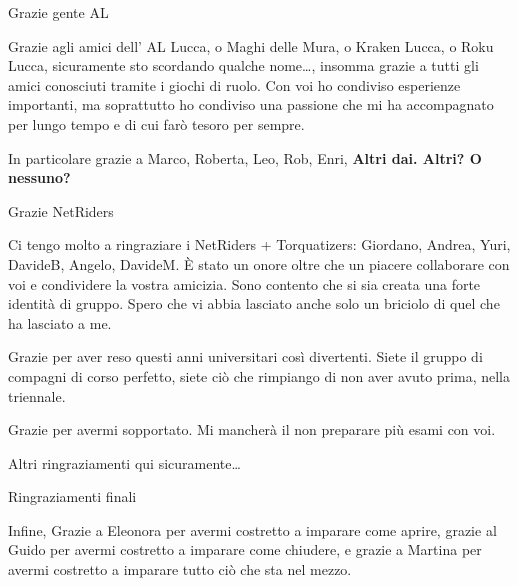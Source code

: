 \documentclass[a4paper,11pt]{article}
\begin{document}
	Grazie gente AL
	
	{\color{red} Grazie agli amici dell' AL Lucca, o Maghi delle Mura, o Kraken Lucca, o Roku Lucca, sicuramente sto scordando qualche nome\dots, insomma grazie a tutti gli amici conosciuti tramite i giochi di ruolo. Con voi ho condiviso esperienze importanti, ma soprattutto ho condiviso una passione che mi ha accompagnato per lungo tempo e di cui farò tesoro per sempre.
	
	In particolare grazie a Marco, Roberta, Leo, Rob, Enri, \textbf{Altri dai. Altri? O nessuno?}}
	\medskip 
	
	Grazie NetRiders
	
	{\color{red} Ci tengo molto a ringraziare i NetRiders + Torquatizers: Giordano, Andrea, Yuri, DavideB, Angelo, DavideM. \`E stato un onore oltre che un piacere collaborare con voi e condividere la vostra amicizia. Sono contento che si sia creata una forte identità di gruppo. Spero che vi abbia lasciato anche solo un briciolo di quel che ha lasciato a me.
		
	Grazie per aver reso questi anni universitari così divertenti. Siete il gruppo di compagni di corso perfetto, siete ciò che rimpiango di non aver avuto prima, nella triennale. 
	
	Grazie per avermi sopportato. Mi mancherà il non preparare più esami con voi.}
	\medskip
	
	Altri ringraziamenti qui sicuramente\dots
	\bigskip
	
	Ringraziamenti finali
	
	{\color{red} Infine, Grazie a Eleonora per avermi costretto a imparare come aprire, grazie al Guido per avermi costretto a imparare come chiudere, e grazie a Martina per avermi costretto a imparare tutto ciò che sta nel mezzo.}
	
\end{document}
